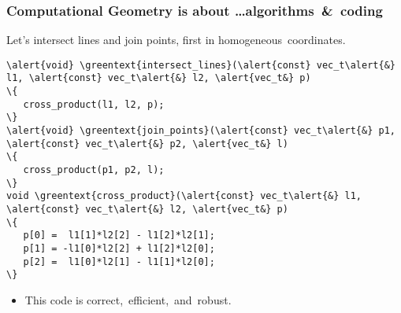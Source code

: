 \documentclass{beamer}
\newcommand{\yellowtext}[1]{\mbox{\color{yellow}#1}}
\newcommand{\greentext}[1]{\mbox{\color{green!50!black}#1}}
\begin{document}
\begin{frame}[t,fragile]
  \frametitle{Computational Geometry is about \dots \yellowtext{algorithms \& coding}}

  Let's intersect lines and join points, first in
  \greentext{homogeneous coordinates}.

\medskip
  \begin{Verbatim}[formatcom=\color{blue},commandchars=\\\{\},fontsize=\scriptsize,xleftmargin=30pt]
\alert{void} \greentext{intersect_lines}(\alert{const} vec_t\alert{&} l1, \alert{const} vec_t\alert{&} l2, \alert{vec_t&} p)
\{
   cross_product(l1, l2, p);
\}
\alert{void} \greentext{join_points}(\alert{const} vec_t\alert{&} p1, \alert{const} vec_t\alert{&} p2, \alert{vec_t&} l)
\{
   cross_product(p1, p2, l);
\}
void \greentext{cross_product}(\alert{const} vec_t\alert{&} l1, \alert{const} vec_t\alert{&} l2, \alert{vec_t&} p)
\{
   p[0] =  l1[1]*l2[2] - l1[2]*l2[1];
   p[1] = -l1[0]*l2[2] + l1[2]*l2[0];
   p[2] =  l1[0]*l2[1] - l1[1]*l2[0];
\}
  \end{Verbatim}

  \begin{itemize}
  \item This code is \greentext{\alert<2>{correct}, \alert<3>{efficient}, and
      \alert<4->{robust}}.

    \qquad
    \begin{overprint}\small
    \end{overprint}
    \end{itemize}
\end{frame}
\end{document}
